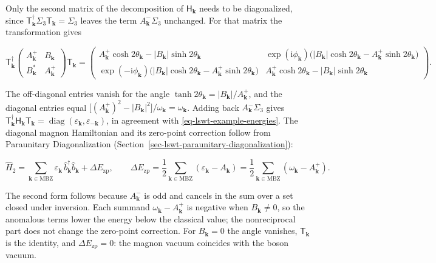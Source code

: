 Only the second matrix of the decomposition of \(\mathsf H_{\mathbf k}\) needs to be diagonalized, since \(\mathsf T_{\mathbf k}^\dagger\Sigma_3\mathsf T_{\mathbf k}=\Sigma_3\) leaves the term \(A_{\mathbf k}^{-}\Sigma_3\) unchanged. For that matrix the transformation gives

\[
\mathsf T_{\mathbf k}^\dagger
\begin{pmatrix}A_{\mathbf k}^{+} & B_{\mathbf k}\\ B_{\mathbf k}^* & A_{\mathbf k}^{+}\end{pmatrix}
\mathsf T_{\mathbf k}
=\begin{pmatrix}
A_{\mathbf k}^{+}\cosh2\theta_{\mathbf k}-|B_{\mathbf k}|\sinh2\theta_{\mathbf k} & \exp(\mathrm i\phi_{\mathbf k})\big(|B_{\mathbf k}|\cosh2\theta_{\mathbf k}-A_{\mathbf k}^{+}\sinh2\theta_{\mathbf k}\big)\\
\exp(-\mathrm i\phi_{\mathbf k})\big(|B_{\mathbf k}|\cosh2\theta_{\mathbf k}-A_{\mathbf k}^{+}\sinh2\theta_{\mathbf k}\big) & A_{\mathbf k}^{+}\cosh2\theta_{\mathbf k}-|B_{\mathbf k}|\sinh2\theta_{\mathbf k}
\end{pmatrix}.
\]

The off-diagonal entries vanish for the angle \(\tanh2\theta_{\mathbf k}=|B_{\mathbf k}|/A_{\mathbf k}^{+}\), and the diagonal entries equal \(\big[(A_{\mathbf k}^{+})^2-|B_{\mathbf k}|^2\big]/\omega_{\mathbf k}=\omega_{\mathbf k}\). Adding back \(A_{\mathbf k}^{-}\Sigma_3\) gives \(\mathsf T_{\mathbf k}^\dagger\mathsf H_{\mathbf k}\mathsf T_{\mathbf k}=\operatorname{diag}(\varepsilon_{\mathbf k},\varepsilon_{-\mathbf k})\), in agreement with \eqref{eq-lswt-example-energies}. The diagonal magnon Hamiltonian and its zero-point correction follow from Paraunitary Diagonalization (Section~\ref{sec-lswt-paraunitary-diagonalization}):

\begin{equation}\label{eq-lswt-example-zero-point}
\hat H_2=\sum_{\mathbf k\in\mathrm{MBZ}}\varepsilon_{\mathbf k}\,\hat b_{\mathbf k}^\dagger\hat b_{\mathbf k}+\Delta E_{\mathrm{zp}},
\qquad
\Delta E_{\mathrm{zp}}=\frac12\sum_{\mathbf k\in\mathrm{MBZ}}\left(\varepsilon_{\mathbf k}-A_{\mathbf k}\right)
=\frac12\sum_{\mathbf k\in\mathrm{MBZ}}\left(\omega_{\mathbf k}-A_{\mathbf k}^{+}\right).
\end{equation}

The second form follows because \(A_{\mathbf k}^{-}\) is odd and cancels in the sum over a set closed under inversion. Each summand \(\omega_{\mathbf k}-A_{\mathbf k}^{+}\) is negative when \(B_{\mathbf k}\ne0\), so the anomalous terms lower the energy below the classical value; the nonreciprocal part does not change the zero-point correction. For \(B_{\mathbf k}=0\) the angle vanishes, \(\mathsf T_{\mathbf k}\) is the identity, and \(\Delta E_{\mathrm{zp}}=0\): the magnon vacuum coincides with the boson vacuum.

